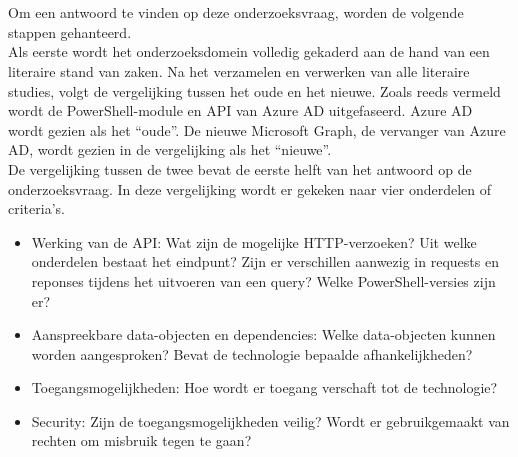 
\chapter{}%
\label{ch:methodologie}


Om een antwoord te vinden op deze onderzoeksvraag, worden de volgende stappen gehanteerd. \\

Als eerste wordt het onderzoeksdomein volledig gekaderd aan de hand van een literaire stand van zaken. Na het verzamelen en verwerken van alle literaire studies, volgt de vergelijking tussen het oude en het nieuwe. Zoals reeds vermeld wordt de PowerShell-module en \ac{API} van Azure \ac{AD} uitgefaseerd. Azure \ac{AD} wordt gezien als het “oude”. De nieuwe Microsoft Graph, de vervanger van Azure \ac{AD}, wordt gezien in de vergelijking als het “nieuwe”. \\

De vergelijking tussen de twee bevat de eerste helft van het antwoord op de onderzoeksvraag. In deze vergelijking wordt er gekeken naar vier onderdelen of criteria's. 

\begin{itemize}
    \item Werking van de \ac{API}: Wat zijn de mogelijke \Ac{HTTP}-verzoeken? Uit welke onderdelen bestaat het eindpunt? Zijn er verschillen aanwezig in requests en reponses tijdens het uitvoeren van een query? Welke PowerShell-versies zijn er?
    \item Aanspreekbare data-objecten en dependencies: Welke data-objecten kunnen worden aangesproken? Bevat de technologie bepaalde afhankelijkheden?
    \item Toegangsmogelijkheden: Hoe wordt er toegang verschaft tot de technologie? 
    \item Security: Zijn de toegangsmogelijkheden veilig? Wordt er gebruikgemaakt van rechten om misbruik tegen te gaan?
\end{itemize}

